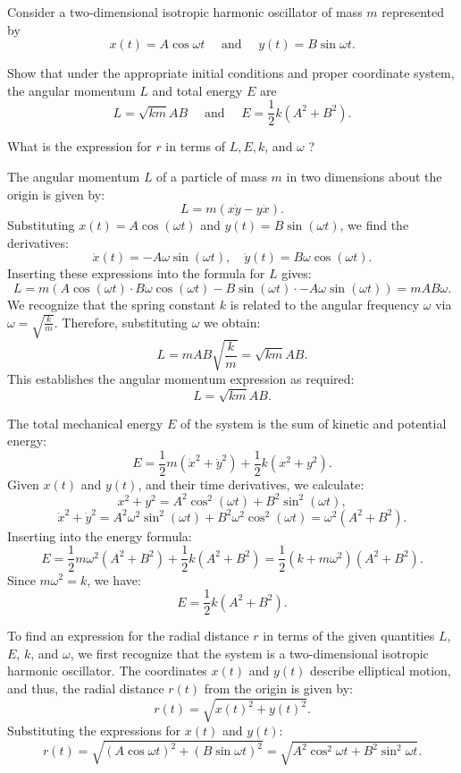 \begin{problem}{6.39}
Consider a two-dimensional isotropic harmonic oscillator of mass \(m\) represented by
\[
x(t)=A \cos \omega t \quad \text { and } \quad y(t)=B \sin \omega t.
\]

Show that under the appropriate initial conditions and proper coordinate system, the angular momentum \(L\) and total energy \(E\) are
\[
L=\sqrt{k m} A B \quad \text { and } \quad E=\frac{1}{2} k\left(A^2+B^2\right).
\]

What is the expression for \(r\) in terms of \(L, E, k\), and \(\omega\) ?
\end{problem}

\begin{solution}{6.39}

The angular momentum \( L \) of a particle of mass \( m \) in two dimensions about the origin is given by:
\[
L = m(x \dot{y} - y \dot{x}).
\]
Substituting \( x(t) = A \cos(\omega t) \) and \( y(t) = B \sin(\omega t) \), we find the derivatives:
\[
\dot{x}(t) = -A \omega \sin(\omega t), \quad \dot{y}(t) = B \omega \cos(\omega t).\]
Inserting these expressions into the formula for \( L \) gives:
\[
L = m(A \cos(\omega t) \cdot B \omega \cos(\omega t) - B \sin(\omega t) \cdot -A \omega \sin(\omega t)) = mAB\omega.
\]
We recognize that the spring constant \( k \) is related to the angular frequency \( \omega \) via \( \omega = \sqrt{\frac{k}{m}} \). Therefore, substituting \( \omega \) we obtain:
\[
L = mAB\sqrt{\frac{k}{m}} = \sqrt{km}AB.
\]
This establishes the angular momentum expression as required:
\[
L = \sqrt{km}AB.
\]

The total mechanical energy \( E \) of the system is the sum of kinetic and potential energy:
\[
E = \frac{1}{2}m(\dot{x}^2 + \dot{y}^2) + \frac{1}{2}k(x^2 + y^2).
\]
Given \( x(t) \) and \( y(t) \), and their time derivatives, we calculate:
\[
x^2 + y^2 = A^2 \cos^2(\omega t) + B^2 \sin^2(\omega t),
\]
\[
\dot{x}^2 + \dot{y}^2 = A^2 \omega^2 \sin^2(\omega t) + B^2 \omega^2 \cos^2(\omega t) = \omega^2(A^2 + B^2).
\]
Inserting into the energy formula:
\[
E = \frac{1}{2}m \omega^2 (A^2 + B^2) + \frac{1}{2}k (A^2 + B^2) = \frac{1}{2}(k + m \omega^2)(A^2 + B^2).
\]
Since \( m \omega^2 = k \), we have:
\[
E = \frac{1}{2} k (A^2 + B^2).
\]



To find an expression for the radial distance \( r \) in terms of the given quantities \( L \), \( E \), \( k \), and \( \omega \), we first recognize that the system is a two-dimensional isotropic harmonic oscillator. The coordinates \( x(t) \) and \( y(t) \) describe elliptical motion, and thus, the radial distance \( r(t) \) from the origin is given by:
\[
r(t) = \sqrt{x(t)^2 + y(t)^2}.
\]
Substituting the expressions for \( x(t) \) and \( y(t) \):
\[
r(t) = \sqrt{(A \cos \omega t)^2 + (B \sin \omega t)^2} = \sqrt{A^2 \cos^2 \omega t + B^2 \sin^2 \omega t}.
\]


\end{solution}
